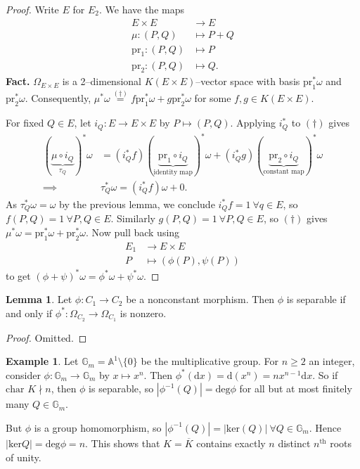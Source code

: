 \documentclass{article}
\theoremstyle{definition}
\newtheorem{lemma}[theorem]{Lemma}
\newtheorem{example}[theorem]{Example}
\begin{document}
\begin{proof}
    Write $E$ for $E_2$. We have the maps
    \begin{align*}
        E \times E &\to E \\
        \mu: (P,Q) &\mapsto P +Q\\
        \text{pr}_1 : (P,Q)&\mapsto P\\
        \text{pr}_2 : (P,Q)&\mapsto Q. 
    \end{align*}
    \textbf{Fact.} $\Omega_{E \times E}$ is a 2--dimensional $K(E \times E)$--vector space with basis $\text{pr}_1^*\omega$ and $\text{pr}_2^*\omega$. Consequently, $\mu^* \omega \stackrel{(\dagger)}{=} f \text{pr}_1^* \omega + g \text{pr}_2^* \omega$ for some $f,g \in K(E \times E)$.
    \vspace{1mm}
     
    For fixed $Q \in E$, let $i_Q : E \to E \times E$ by $P \mapsto (P,Q)$. Applying $i^*_Q$ to $(\dagger)$ gives 
    \begin{align*}
        (\underbrace{\mu \circ i_Q}_{\tau_Q})^* \omega &= (i_Q^* f)(\underbrace{\text{pr}_1 \circ i_Q}_{\text{identity map}})^* \omega + (i_Q^* g)(\underbrace{\text{pr}_2 \circ i_Q}_{\text{constant map}})^* \omega\\
        \implies & \tau_Q^* \omega = (i_Q^*f)\omega + 0.
    \end{align*}
    As $\tau_Q^*\omega = \omega$ by the previous lemma, we conclude $i_Q^*f = 1 ~\forall q \in E$, so $f(P,Q) = 1 ~\forall P,Q \in E$. Similarly $g(P,Q) = 1 ~\forall P,Q \in E$, so $(\dagger)$ gives $\mu^* \omega = \text{pr}_1^* \omega + \text{pr}_2^* \omega$. Now pull back using
    \begin{align*}
        E_1 &\to E \times E\\
        P &\mapsto (\phi(P),\psi(P))
    \end{align*}
    to get $(\phi+\psi)^*\omega = \phi^* \omega + \psi^* \omega$.
\end{proof}
\begin{lemma}\label{lemma6.4}
    Let $\phi : C_1 \to C_2$ be a nonconstant morphism. Then $\phi$ is separable if and only if $\phi^* : \Omega_{C_2} \to \Omega_{C_1}$ is nonzero.
\end{lemma}
\begin{proof}
    Omitted.
\end{proof}
\begin{example}
    Let $\mathbb{G}_m = \mathbb{A}^1 \setminus \{0\}$ be the multiplicative group. For $n\ge 2$ an integer, consider $\phi : \mathbb{G}_m \to \mathbb{G}_m$ by $x \mapsto x^n$. Then $\phi^*(\mathrm{d}x)=\mathrm{d}(x^n)=nx^{n-1}\mathrm{d}x$. So if $\text{char }K \nmid n$, then $\phi$ is separable, so $\left|\phi^{-1}(Q)\right|=\text{deg} \phi$ for all but at most finitely many $Q \in \mathbb{G}_m$.
    \vspace{1mm}
     
    But $\phi$ is a group homomorphism, so $\left|\phi^{-1}(Q)\right|=\left|\text{ker}(Q)\right| ~\forall Q \in \mathbb{G}_m$. Hence $\left|\text{ker}Q \right| = \text{deg}\phi = n$. This shows that $K = \overline{K}$ contains exactly $n$ distinct $n^{\text{th}}$ roots of unity.
\end{example}
\end{document}
